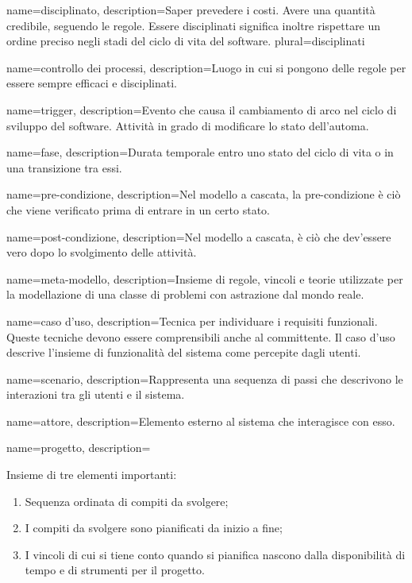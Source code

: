 {
name=disciplinato,
description={Saper prevedere i costi. Avere una quantit\`a credibile, seguendo le regole. Essere disciplinati significa inoltre rispettare un ordine preciso negli stadi del ciclo di vita del software.}
plural=disciplinati
}

{
name=controllo dei processi,
description={Luogo in cui si pongono delle regole per essere sempre efficaci e disciplinati.}
}

{
name=trigger,
description={Evento che causa il cambiamento di arco nel ciclo di sviluppo del software. Attivit\`a in grado di modificare lo stato dell'automa.}
}

{
name=fase,
description={Durata temporale entro uno stato del ciclo di vita o in una transizione tra essi.}
}


{
name=pre-condizione,
description={Nel modello a cascata, la pre-condizione \`e ci\`o che viene verificato prima di entrare in un certo stato.}
}

{
name=post-condizione,
description={Nel modello a cascata, \`e ci\`o che dev'essere vero dopo lo svolgimento delle attivit\`a.}
}

{
name=meta-modello,
description={Insieme di regole, vincoli e teorie utilizzate per la modellazione di una classe di problemi con astrazione dal mondo reale.}
}

{
name=caso d'uso,
description={Tecnica per individuare i requisiti funzionali. Queste tecniche devono essere comprensibili anche al committente. Il caso d'uso descrive l'insieme di funzionalit\`a del sistema come percepite dagli utenti.}
}

{
name=scenario,
description={Rappresenta una sequenza di passi che descrivono le interazioni tra gli utenti e il sistema.}
}

{
name=attore,
description={Elemento esterno al sistema che interagisce con esso.}
}

{
name=progetto,
description={Insieme di tre elementi importanti: \begin{enumerate}
\item Sequenza ordinata di compiti da svolgere;
\item I compiti da svolgere sono pianificati da inizio a fine;
\item I vincoli di cui si tiene conto quando si pianifica nascono dalla disponibilità di tempo e di strumenti per il progetto.
\end{enumerate}
}
}

